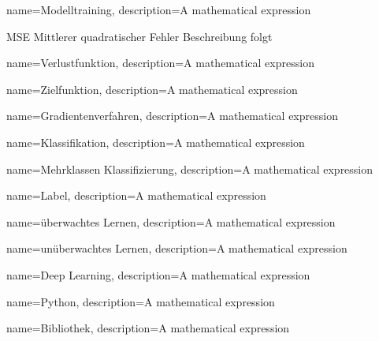 {
        name=Modelltraining,
        description={A mathematical expression}
}

\newglossaryentrywithacronym
{MSE}
{Mittlerer quadratischer Fehler}
{Beschreibung folgt}

{
        name=Verlustfunktion,
        description={A mathematical expression}
}

{
        name=Zielfunktion,
        description={A mathematical expression}
}

{
        name=Gradientenverfahren,
        description={A mathematical expression}
}

{
        name=Klassifikation,
        description={A mathematical expression}
}

{
        name=Mehrklassen Klassifizierung,
        description={A mathematical expression}
}

{
        name=Label,
        description={A mathematical expression}
}

{
        name=überwachtes Lernen,
        description={A mathematical expression}
}

{
        name=unüberwachtes Lernen,
        description={A mathematical expression}
}

{
        name=Deep Learning,
        description={A mathematical expression}
}


{
        name=Python,
        description={A mathematical expression}
}

{
        name=Bibliothek,
        description={A mathematical expression}
}





